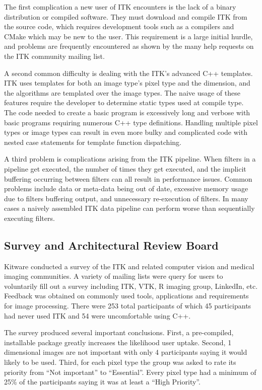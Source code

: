 \documentclass{frontiersMED} %
\begin{document}
The first complication a new user of ITK encounters is the lack of a
binary distribution or compiled software. They must download and
compile ITK from the source code, which requires development tools
such as a compilers and CMake which may be new to the user. This
requirement is a large initial hurdle, and problems are frequently
encountered as shown by the many help requests on the ITK community
mailing list.

A second common difficulty is dealing with the ITK's advanced C++
templates. ITK uses templates for both an image type's pixel type and
the dimension, and the algorithms are templated over the image
types. The naive usage of these features require the developer to
determine static types used at compile type.  The code needed to
create a basic program is excessively long and verbose with basic
programs requiring numerous C++ type definitions.  Handling multiple pixel
types or image types can result in even more bulky and complicated code
with nested case statements for template function dispatching.

A third problem is complications arising from the ITK pipeline. When
filters in a pipeline get executed, the number of times they get
executed, and the implicit buffering occurring between filters can all
result in performance issues. Common problems include data or
meta-data being out of date, excessive memory usage due to filters
buffering output, and unnecessary re-execution of filters. In many
cases a naively assembled ITK data pipeline can perform worse than
sequentially executing filters.


\subsection {Survey and Architectural Review Board}
Kitware conducted a survey of the ITK and related computer vision and
medical imaging communities. A variety of mailing lists were query for
users to voluntarily fill out a survey including ITK, VTK, R imaging
group, LinkedIn, etc. Feedback was obtained on commonly used tools,
applications and requirements for image processing. There were 253
total participants of which 45 participants had never used ITK and 54
were uncomfortable using C++.

The survey produced several important conclusions. First, a pre-compiled,
installable package greatly increases the likelihood user uptake. Second,
1 dimensional images are not important with only 4 participants saying
it would likely to be used. Third, for each pixel type the group was
asked to rate its priority from ``Not important'' to ``Essential''. Every
pixel type had a minimum of 25\% of the participants saying it was at least
a ``High Priority''.
\end{document}
